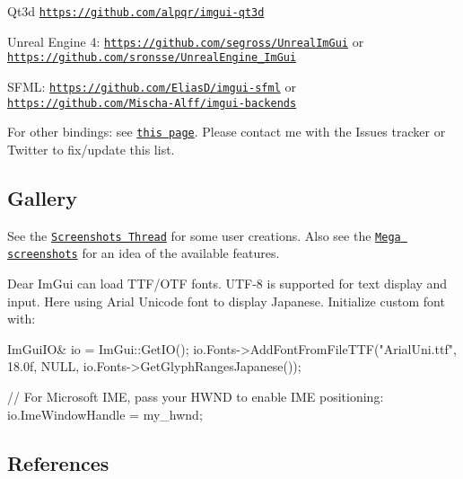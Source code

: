 \begin{DoxyItemize}
\item Qt3d \href{https://github.com/alpqr/imgui-qt3d}{\tt https\+://github.\+com/alpqr/imgui-\/qt3d}
\item Unreal Engine 4\+: \href{https://github.com/segross/UnrealImGui}{\tt https\+://github.\+com/segross/\+Unreal\+Im\+Gui} or \href{https://github.com/sronsse/UnrealEngine_ImGui}{\tt https\+://github.\+com/sronsse/\+Unreal\+Engine\+\_\+\+Im\+Gui}
\item S\+F\+ML\+: \href{https://github.com/EliasD/imgui-sfml}{\tt https\+://github.\+com/\+Elias\+D/imgui-\/sfml} or \href{https://github.com/Mischa-Alff/imgui-backends}{\tt https\+://github.\+com/\+Mischa-\/\+Alff/imgui-\/backends}
\end{DoxyItemize}

For other bindings\+: see \href{https://github.com/ocornut/imgui/wiki/Links/}{\tt this page}. Please contact me with the Issues tracker or Twitter to fix/update this list.

\subsection*{Gallery }

See the \href{https://github.com/ocornut/imgui/issues/123}{\tt Screenshots Thread} for some user creations. Also see the \href{https://github.com/ocornut/imgui/issues/1273}{\tt Mega screenshots} for an idea of the available features.

 \href{https://cloud.githubusercontent.com/assets/8225057/20628927/33e14cac-b329-11e6-80f6-9524e93b048a.png}{\tt } 

\href{https://raw.githubusercontent.com/wiki/ocornut/imgui/web/v148/profiler.png}{\tt }



  

Dear Im\+Gui can load T\+T\+F/\+O\+TF fonts. U\+T\+F-\/8 is supported for text display and input. Here using Arial Unicode font to display Japanese. Initialize custom font with\+: 
\begin{DoxyCode}
ImGuiIO& io = ImGui::GetIO();
io.Fonts->AddFontFromFileTTF("ArialUni.ttf", 18.0f, NULL, io.Fonts->GetGlyphRangesJapanese());

// For Microsoft IME, pass your HWND to enable IME positioning:
io.ImeWindowHandle = my\_hwnd;
\end{DoxyCode}
 

\subsection*{References }


